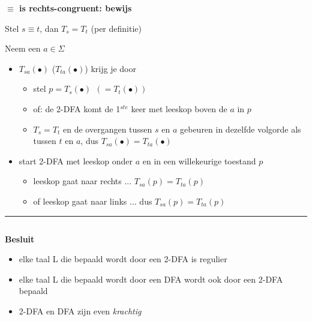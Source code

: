 \documentclass{seminar}
\newcommand{\prend}{\hfill \rule{2.3mm}{2.3mm} \hspace*{3mm} $ $}
\begin{document}
\begin{slide}
{\bf $\equiv$ is rechts-congruent: bewijs}

Stel $s \equiv t$, dan $T_s = T_t$ (per definitie)

Neem een $a \in \Sigma$

\begin{itemize}
\item 
$T_{sa}(\bullet)$ ($T_{ta}(\bullet)$) krijg je door
\begin{itemize}
\item 
stel $p = T_s(\bullet)~~(= T_t(\bullet))$

\item 
of: de 2-DFA komt de 1$^{ste}$ keer met leeskop boven de $a$ in $p$

\item 
$T_s = T_t$ en de overgangen tussen $s$ en $a$ gebeuren in dezelfde
volgorde als tussen $t$ en $a$, dus $T_{sa}(\bullet) =
T_{ta}(\bullet)$

\end{itemize}

\item 
start 2-DFA met leeskop onder $a$
en in een willekeurige toestand $p$
\begin{itemize}
\item 
leeskop gaat naar rechts ... $T_{sa}(p) = T_{ta}(p)$
\item 
of leeskop gaat naar links ... dus $T_{sa}(p) = T_{ta}(p)$
\end{itemize}

\end{itemize}

\prend

\end{slide} 


\begin{slide}
{\bf Besluit}

\begin{itemize}
\item 
elke taal L die bepaald wordt door een 2-DFA is regulier
\item 
elke taal L die bepaald wordt door een DFA wordt ook door een 2-DFA
bepaald
\item 
2-DFA en DFA zijn even {\em krachtig}
\end{itemize}

\end{slide} 
\end{document}
